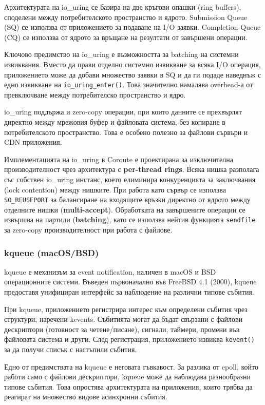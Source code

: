 Архитектурата на io\_uring се базира на две кръгови опашки (ring buffers), споделени между потребителското пространство и ядрото. Submission Queue (SQ) се използва от приложението за подаване на I/O заявки. Completion Queue (CQ) се използва от ядрото за връщане на резултати от завършени операции.

Ключово предимство на io\_uring е възможността за batching на системни извиквания. Вместо да прави отделно системно извикване за всяка I/O операция, приложението може да добави множество заявки в SQ и да ги подаде наведнъж с едно извикване на \texttt{io\_uring\_enter()}. Това значително намалява overhead-а от превключване между потребителско пространство и ядро.

io\_uring поддържа и zero-copy операции, при които данните се прехвърлят директно между мрежовия буфер и файловата система, без копиране в потребителското пространство. Това е особено полезно за файлови сървъри и CDN приложения.

Имплементацията на io\_uring в Coroute е проектирана за изключителна производителност чрез архитектура с \textbf{per-thread rings}. Всяка нишка разполага със собствен io\_uring инстанс, което елиминира конкуренцията за заключвания (lock contention) между нишките. При работа като сървър се използва \texttt{SO\_REUSEPORT} за балансиране на входящите връзки директно от ядрото между отделните нишки (\textbf{multi-accept}). Обработката на завършените операции се извършва на партиди (\textbf{batching}), като се използва нейтив функцията \texttt{sendfile} за zero-copy производителност при работа с файлове.

\subsubsection{kqueue (macOS/BSD)}

kqueue \cite{kqueue} е механизъм за event notification, наличен в macOS и BSD операционните системи. Въведен първоначално във FreeBSD 4.1 (2000), kqueue предоставя унифициран интерфейс за наблюдение на различни типове събития.

При kqueue, приложението регистрира интерес към определени събития чрез структури, наречени kevents. Събитията могат да бъдат свързани с файлови дескриптори (готовност за четене/писане), сигнали, таймери, промени във файловата система и други. След регистрация, приложението извиква \texttt{kevent()} за да получи списък с настъпили събития.

Едно от предимствата на kqueue е неговата гъвкавост. За разлика от epoll, който работи само с файлови дескриптори, kqueue може да наблюдава разнообразни типове събития. Това опростява архитектурата на приложения, които трябва да реагират на множество видове асинхронни събития.

